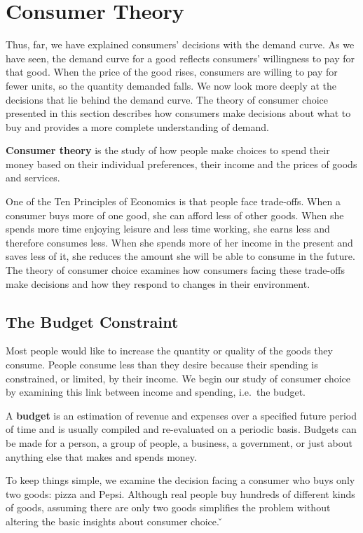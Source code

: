 \section{Consumer Theory}

Thus, far, we have explained consumers' decisions with the demand curve. As we have seen, the demand curve for a good
reflects consumers' willingness to pay for that good. When the price of the good rises, consumers are willing to pay
for fewer units, so the quantity demanded falls. We now look more deeply at the decisions that lie behind the demand
curve. The theory of consumer choice presented in this section describes how consumers make decisions about what to
buy and provides a more complete understanding of demand.

\textbf{Consumer theory} is the study of how people make choices to spend their money based on their individual
preferences, their income and the prices of goods and services.
\ed

One of the Ten Principles of Economics is that people face trade-offs. When a consumer buys more of one good, she can
afford less of other goods. When she spends more time enjoying leisure and less time working, she earns less and
therefore consumes less. When she spends more of her income in the present and saves less of it, she reduces the
amount she will be able to consume in the future. The theory of consumer choice examines how consumers facing these
trade-offs make decisions and how they respond to changes in their environment.

\subsection{The Budget Constraint}

Most people would like to increase the quantity or quality of the goods they consume. People consume less than they
desire because their spending is constrained, or limited, by their income. We begin our study of consumer choice by
examining this link between income and spending, i.e.\ the budget.

\bd[Budget]
A \textbf{budget} is an estimation of revenue and expenses over a specified future period of time and is usually
compiled and re-evaluated on a periodic basis. Budgets can be made for a person, a group of people, a business, a
government, or just about anything else that makes and spends money.
\ed

To keep things simple, we examine the decision facing a consumer who buys only two goods: pizza and Pepsi. Although
real people buy hundreds of different kinds of goods, assuming there are only two goods simplifies the problem
without altering the basic insights about consumer choice. \v

